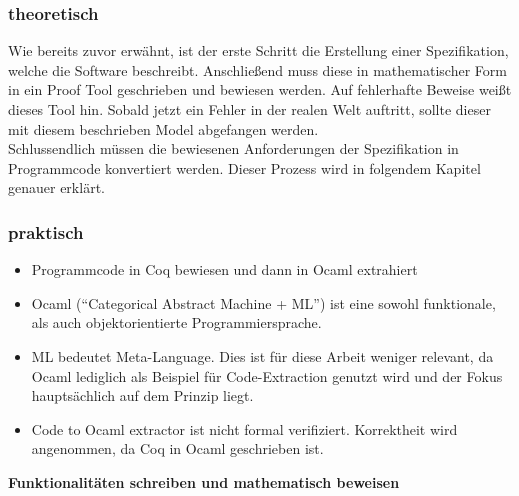 \subsubsection{theoretisch}
{Wie bereits zuvor erwähnt, ist der erste Schritt die Erstellung einer Spezifikation, welche die Software beschreibt. Anschließend muss diese in mathematischer Form in ein Proof Tool geschrieben und bewiesen werden. Auf fehlerhafte Beweise weißt dieses Tool hin.
Sobald jetzt ein Fehler in der realen Welt auftritt, sollte dieser mit diesem beschrieben Model abgefangen werden. \\
Schlussendlich müssen die bewiesenen Anforderungen der Spezifikation in Programmcode konvertiert werden. Dieser Prozess wird in folgendem Kapitel genauer erklärt.}\cite{HELWER01:FV}

\subsubsection{praktisch}
\begin{itemize}
	\item Programmcode in Coq bewiesen und dann in Ocaml extrahiert
	\item Ocaml ("`Categorical Abstract Machine + ML"') ist eine sowohl funktionale, als auch objektorientierte Programmiersprache.
	\item ML bedeutet Meta-Language. Dies ist für diese Arbeit weniger relevant, da Ocaml lediglich als Beispiel für Code-Extraction genutzt wird und der Fokus hauptsächlich auf dem Prinzip liegt.
	\item Code to Ocaml extractor ist nicht formal verifiziert. Korrektheit wird angenommen, da Coq in Ocaml geschrieben ist.
\end{itemize}
\textbf{Funktionalitäten schreiben und mathematisch beweisen}

